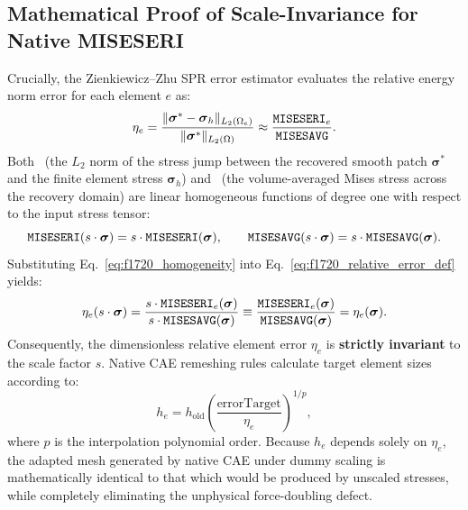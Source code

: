 \subsection{Mathematical Proof of Scale-Invariance for Native MISESERI}
\label{subsec:f1720_scale_invariance}

Crucially, the Zienkiewicz--Zhu SPR error estimator evaluates the relative energy norm error for each element $e$ as:
\begin{equation}
  \eta_e = \frac{\Vert \boldsymbol{\sigma}^* - \boldsymbol{\sigma}_h \Vert_{L_2(\Omega_e)}}{\Vert \boldsymbol{\sigma}^* \Vert_{L_2(\Omega)}} \approx \frac{\texttt{MISESERI}_e}{\texttt{MISESAVG}}.
  \label{eq:f1720_relative_error_def}
\end{equation}
Both \MISESERI\ (the $L_2$ norm of the stress jump between the recovered smooth patch $\boldsymbol{\sigma}^*$ and the finite element stress $\boldsymbol{\sigma}_h$) and \MISESAVG\ (the volume-averaged Mises stress across the recovery domain) are linear homogeneous functions of degree one with respect to the input stress tensor:
\begin{equation}
  \texttt{MISESERI}(s \cdot \boldsymbol{\sigma}) = s \cdot \texttt{MISESERI}(\boldsymbol{\sigma}), \qquad \texttt{MISESAVG}(s \cdot \boldsymbol{\sigma}) = s \cdot \texttt{MISESAVG}(\boldsymbol{\sigma}).
  \label{eq:f1720_homogeneity}
\end{equation}
Substituting Eq.~\eqref{eq:f1720_homogeneity} into Eq.~\eqref{eq:f1720_relative_error_def} yields:
\begin{equation}
  \eta_e(s \cdot \boldsymbol{\sigma}) = \frac{s \cdot \texttt{MISESERI}_e(\boldsymbol{\sigma})}{s \cdot \texttt{MISESAVG}(\boldsymbol{\sigma})} \equiv \frac{\texttt{MISESERI}_e(\boldsymbol{\sigma})}{\texttt{MISESAVG}(\boldsymbol{\sigma})} = \eta_e(\boldsymbol{\sigma}).
  \label{eq:f1720_scale_invariance_proof}
\end{equation}
Consequently, the dimensionless relative element error $\eta_e$ is \textbf{strictly invariant} to the scale factor $s$. Native \Abaqus CAE remeshing rules calculate target element sizes according to:
\begin{equation}
  h_e = h_{\mathrm{old}} \left( \frac{\mathrm{errorTarget}}{\eta_e} \right)^{1/p},
  \label{eq:f1720_sizing_rule}
\end{equation}
where $p$ is the interpolation polynomial order. Because $h_e$ depends solely on $\eta_e$, the adapted mesh generated by native \Abaqus CAE under dummy scaling is mathematically identical to that which would be produced by unscaled stresses, while completely eliminating the unphysical force-doubling defect.

